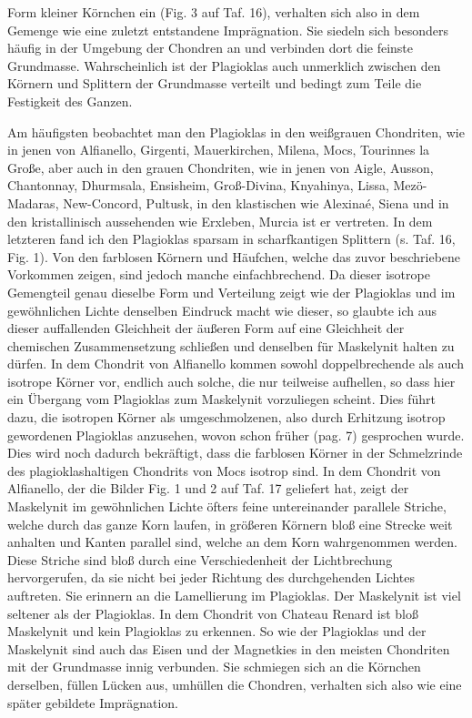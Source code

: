 \documentclass[a4paper, 11pt, oneside, polutonikogreek, german]{article}
\begin{document}
Form kleiner Körnchen ein (Fig. 3 auf Taf. 16), verhalten sich also in dem Gemenge wie eine zuletzt entstandene Imprägnation. Sie siedeln sich besonders häufig in der Umgebung der Chondren an und verbinden dort die feinste Grundmasse. Wahrscheinlich ist der Plagioklas auch unmerklich zwischen den Körnern und Splittern der Grundmasse verteilt und bedingt zum Teile die Festigkeit des Ganzen.

Am häufigsten beobachtet man den Plagioklas in den weißgrauen Chondriten, wie in jenen von Alfianello, Girgenti, Mauerkirchen, Milena, Mocs, Tourinnes la Große, aber auch in den grauen Chondriten, wie in jenen von Aigle, Ausson, Chantonnay, Dhurmsala, Ensisheim, Groß-Divina, Knyahinya, Lissa, Mezö-Madaras, New-Concord, Pultusk, in den klastischen wie Alexinaé, Siena und in den kristallinisch aussehenden wie Erxleben, Murcia ist er vertreten. In dem letzteren fand ich den Plagioklas sparsam in scharfkantigen Splittern (s. Taf. 16, Fig. 1). Von den farblosen Körnern und Häufchen, welche das zuvor beschriebene Vorkommen zeigen, sind jedoch manche einfachbrechend. Da dieser isotrope Gemengteil genau dieselbe Form und Verteilung zeigt wie der Plagioklas und im gewöhnlichen Lichte denselben Eindruck macht wie dieser, so glaubte ich aus dieser auffallenden Gleichheit der äußeren Form auf eine Gleichheit der chemischen Zusammensetzung schließen und denselben für Maskelynit halten zu dürfen. In dem Chondrit von Alfianello kommen sowohl doppelbrechende als auch isotrope Körner vor, endlich auch solche, die nur teilweise aufhellen, so dass hier ein Übergang vom Plagioklas zum Maskelynit vorzuliegen scheint. Dies führt dazu, die isotropen Körner als umgeschmolzenen, also durch Erhitzung isotrop gewordenen Plagioklas anzusehen, wovon schon früher (pag. 7) gesprochen wurde. Dies wird noch dadurch bekräftigt, dass die farblosen Körner in der Schmelzrinde des plagioklashaltigen Chondrits von Mocs isotrop sind. In dem Chondrit von Alfianello, der die Bilder Fig. 1 und 2 auf Taf. 17 geliefert hat, zeigt der Maskelynit im gewöhnlichen Lichte öfters feine untereinander parallele Striche, welche durch das ganze Korn laufen, in größeren Körnern bloß eine Strecke weit anhalten und Kanten parallel sind, welche an dem Korn wahrgenommen werden. Diese Striche sind bloß durch eine Verschiedenheit der Lichtbrechung hervorgerufen, da sie nicht bei jeder Richtung des durchgehenden Lichtes auftreten. Sie erinnern an die Lamellierung im Plagioklas. Der Maskelynit ist viel seltener als der Plagioklas. In dem Chondrit von Chateau Renard ist bloß Maskelynit und kein Plagioklas zu erkennen. So wie der Plagioklas und der Maskelynit sind auch das Eisen und der Magnetkies in den meisten Chondriten mit der Grundmasse innig verbunden. Sie schmiegen sich an die Körnchen derselben, füllen Lücken aus, umhüllen die Chondren, verhalten sich also wie eine später gebildete Imprägnation.
\end{document}
